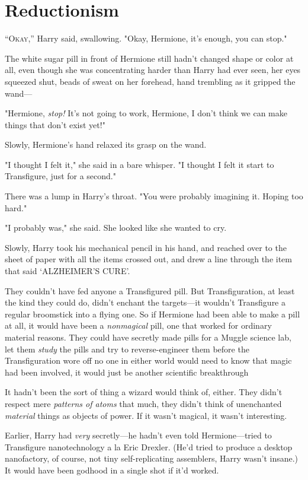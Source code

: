 \chapter{Reductionism}

\lettrine{“O}{kay,''} Harry said, swallowing. "Okay, Hermione, it's enough, you can stop."

The white sugar pill in front of Hermione still hadn't changed shape or color
at all, even though she was concentrating harder than Harry had ever seen, her
eyes squeezed shut, beads of sweat on her forehead, hand trembling as it
gripped the wand---

"Hermione, \emph{stop!} It's not going to work, Hermione, I don't think we can
make things that don't exist yet!"

Slowly, Hermione's hand relaxed its grasp on the wand.

"I thought I felt it," she said in a bare whisper. "I thought I felt it start
to Transfigure, just for a second."

There was a lump in Harry's throat. "You were probably imagining it. Hoping too
hard."

"I probably was," she said. She looked like she wanted to cry.

Slowly, Harry took his mechanical pencil in his hand, and reached over to the
sheet of paper with all the items crossed out, and drew a line through the item
that said `ALZHEIMER'S CURE'.

They couldn't have fed anyone a Transfigured pill. But Transfiguration, at
least the kind they could do, didn't enchant the targets---it wouldn't
Transfigure a regular broomstick into a flying one. So if Hermione had been
able to make a pill at all, it would have been a \emph{nonmagical} pill, one
that worked for ordinary material reasons. They could have secretly made pills
for a Muggle science lab, let them \emph{study} the pills and try to
reverse-engineer them before the Transfiguration wore off{\el} no one in
either world would need to know that magic had been involved, it would just be
another scientific breakthrough{\el}

It hadn't been the sort of thing a wizard would think of, either. They didn't
respect mere \emph{patterns of atoms} that much, they didn't think of
unenchanted \emph{material} things as objects of power. If it wasn't magical,
it wasn't interesting.

Earlier, Harry had \emph{very} secretly---he hadn't even told Her\-mi\-o\-ne---tried
to Transfigure nanotechnology a la Eric Drexler. (He'd tried to produce a
desktop nanofactory, of course, not tiny self-replicating assemblers, Harry
wasn't insane.) It would have been godhood in a single shot if it'd worked.

